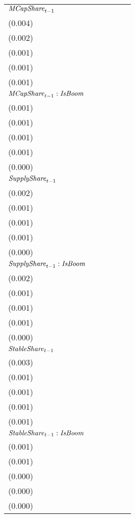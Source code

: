 \begin{tabular}{llllll}
${{\it MCapShare}}_{t-1}$                   &      \makecell{$0.004^{}$ \\ (0.004)} &   \makecell{$0.034^{***}$ \\ (0.002)} &   \makecell{$0.036^{***}$ \\ (0.001)} &   \makecell{$0.027^{***}$ \\ (0.001)} &   \makecell{$0.040^{***}$ \\ (0.001)} \\
${{\it MCapShare}}_{t-1} : {\it IsBoom}$    &   \makecell{$0.005^{***}$ \\ (0.001)} &   \makecell{$0.034^{***}$ \\ (0.001)} &   \makecell{$0.019^{***}$ \\ (0.001)} &   \makecell{$0.011^{***}$ \\ (0.001)} &   \makecell{$0.005^{***}$ \\ (0.000)} \\
${{\it SupplyShare}}_{t-1}$                 &   \makecell{$0.037^{***}$ \\ (0.002)} &   \makecell{$0.006^{***}$ \\ (0.001)} &   \makecell{$0.003^{***}$ \\ (0.001)} &   \makecell{$0.021^{***}$ \\ (0.001)} &   \makecell{$0.002^{***}$ \\ (0.000)} \\
${{\it SupplyShare}}_{t-1} : {\it IsBoom}$  &   \makecell{$-0.003^{**}$ \\ (0.002)} &      \makecell{$0.001^{}$ \\ (0.001)} &     \makecell{$0.001^{*}$ \\ (0.001)} &  \makecell{$-0.009^{***}$ \\ (0.001)} &  \makecell{$-0.002^{***}$ \\ (0.000)} \\
${{\it StableShare}}_{t-1}$                 &   \makecell{$0.115^{***}$ \\ (0.003)} &     \makecell{$0.002^{*}$ \\ (0.001)} &  \makecell{$-0.003^{***}$ \\ (0.001)} &   \makecell{$0.049^{***}$ \\ (0.001)} &   \makecell{$0.016^{***}$ \\ (0.001)} \\
${{\it StableShare}}_{t-1} : {\it IsBoom}$  &  \makecell{$-0.015^{***}$ \\ (0.001)} &  \makecell{$-0.010^{***}$ \\ (0.001)} &  \makecell{$-0.005^{***}$ \\ (0.000)} &  \makecell{$-0.016^{***}$ \\ (0.000)} &  \makecell{$-0.006^{***}$ \\ (0.000)} \\

\end{tabular}

